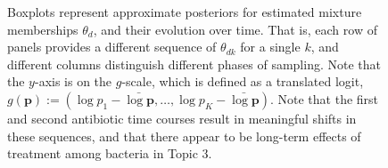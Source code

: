 \documentclass[final]{beamer}
\newlength{\onecolwid}
\begin{document}
\begin{frame}
\begin{columns}
\begin{column}{\onecolwid}
\begin{figure}[!p]
  \caption{Boxplots represent approximate posteriors for estimated mixture
    memberships $\theta_{d}$, and their evolution over time. That is, each row
    of panels provides a different sequence of $\theta_{dk}$ for a single $k$,
    and different columns distinguish different phases of sampling. Note that
    the $y$-axis is on the $g$-scale, which is defined as a translated logit,
    $g\left(\mathbf{p}\right) := \left(\log p_{1} - \bar{\log \mathbf{p}},
    \dots,\log p_{K} - \bar{\log \mathbf{p}}\right)$. Note that the first
    and second antibiotic time courses result in meaningful shifts in these
    sequences, and that there appear to be long-term effects of treatment among
    bacteria in Topic 3. \label{fig:antibiotics_lda_theta}}
\end{figure}
\end{column}
\end{columns}

\end{frame}


\end{document}

